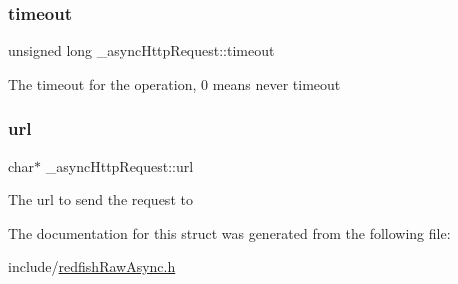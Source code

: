 \subsubsection{\texorpdfstring{timeout}{timeout}}
{\footnotesize\ttfamily unsigned long \+\_\+async\+Http\+Request\+::timeout}

The timeout for the operation, 0 means never timeout \mbox{\label{struct__asyncHttpRequest_ade18f96cd3e2cb3395dd978597283a9f}} 
\subsubsection{\texorpdfstring{url}{url}}
{\footnotesize\ttfamily char$\ast$ \+\_\+async\+Http\+Request\+::url}

The url to send the request to 

The documentation for this struct was generated from the following file\+:\begin{DoxyCompactItemize}
\item 
include/\hyperlink{redfishRawAsync_8h}{redfish\+Raw\+Async.\+h}\end{DoxyCompactItemize}
